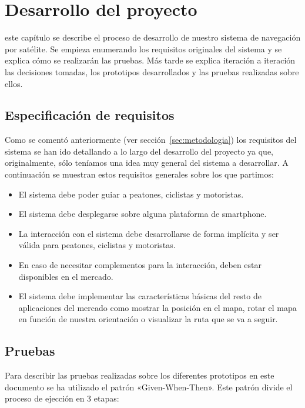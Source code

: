 \chapter{Desarrollo del proyecto}
\label{chap:desarrollo}

 este capítulo se describe el proceso de desarrollo de nuestro sistema de navegación por
satélite. Se empieza enumerando los requisitos originales del sistema y se explica cómo se
realizarán las pruebas. Más tarde se explica iteración a iteración las decisiones tomadas, los
prototipos desarrollados y las pruebas realizadas sobre ellos.

\section{Especificación de requisitos}

Como se comentó anteriormente (ver sección~\ref{sec:metodologia}) los requisitos del sistema se
han ido detallando a lo largo del desarrollo del proyecto ya que, originalmente, sólo teníamos una
idea muy general del sistema a desarrollar. A continuación se muestran estos requisitos generales
sobre los que partimos:

\begin{itemize}
  \item El sistema debe poder guiar a peatones, ciclistas y motoristas.
  \item El sistema debe desplegarse sobre alguna plataforma de smartphone.
  \item La interacción con el sistema debe desarrollarse de forma implícita y ser válida para
    peatones, ciclistas y motoristas.
  \item En caso de necesitar complementos para la interacción, deben estar disponibles en el
    mercado.
  \item El sistema debe implementar las características básicas del resto de aplicaciones del
    mercado como mostrar la posición en el mapa, rotar el mapa en función de nuestra orientación o
    visualizar la ruta que se va a seguir.
\end{itemize}

\section{Pruebas}

Para describir las pruebas realizadas sobre los diferentes prototipos en este documento se ha
utilizado el patrón «Given-When-Then». Este patrón divide el proceso de ejección en 3 etapas:

